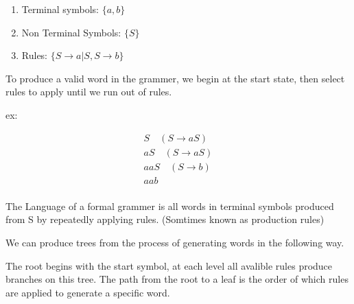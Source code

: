 \documentclass{report}
\begin{document}
\begin{description}
\begin{mdframed}
            \begin{enumerate}
                \item Terminal symbols: $\{a, b\}$
                \item Non Terminal Symbols: $\{S\}$ 
                \item Rules: $\{S \to a|S, S \to b\}$
            \end{enumerate}

            To produce a valid word in the grammer,
            we begin at the start state, then select
            rules to apply until we run
            out of rules.

            ex:

            \begin{gather}
               S \quad (S \to aS)\\ 
               aS \quad (S \to aS)\\
               aaS \quad (S \to b)\\
               aab\\
            \end{gather}
        \end{mdframed}
        \begin{mdframed}
            The Language of a formal grammer is all
            words in terminal symbols produced from S by
            repeatedly applying rules. (Somtimes known as
            production rules)

            We can produce trees from the process of generating
            words in the following way.

            The root begins with the start symbol, at each
            level all avalible rules produce branches on this
            tree. The path from the root to a leaf is the
            order of which rules are applied to generate
            a specific word.


\end{mdframed}
\end{description}
\end{document}
